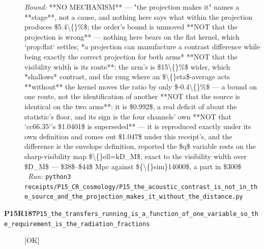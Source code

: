 \begin{description}
 \emph{Bound:}  **NO MECHANISM** --- "the projection makes it" names a **stage**, not a cause, and nothing here says what within the projection produces \$5.4\textbackslash\{\}\%\$; the order's bound is unmoved  **NOT that the projection is wrong** --- nothing here bears on the flat kernel, which `prop:flat` settles; *a projection can manufacture a contrast difference while being exactly the correct projection for both arms*  **NOT that the visibility width is its route**: the arm's is \$15\textbackslash\{\}\%\$ wider, which *shallows* contrast, and the rung where an \$\textbackslash\{\}eta\$-average acts **without** the kernel moves the ratio by only \$-0.4\textbackslash\{\}\%\$ --- a bound on one route, not the identification of another  **NOT that the source is identical on the two arms**: it is \$0.992\$, a real deficit of about the statistic's floor, and its sign is the four channels' own  **NOT that `cc66.35`'s \$1.0401\$ is superseded** --- it is reproduced exactly under its own definition and comes out \$1.047\$ under this receipt's, and the difference is the envelope definition, reported  the \$q\$ variable rests on the sharp-visibility map \$\textbackslash\{\}ell=kD\_M\$, exact to the visibility width over \$D\_M\$ --- \$38\$--\$44\$ Mpc against \$\{\textbackslash\{\}sim\}14000\$, a part in \$300\$
\ \emph{Run:} \texttt{python3 receipts/P15\_CR\_cosmology/P15\_the\_acoustic\_contrast\_is\_not\_in\_the\_source\_and\_the\_projection\_makes\_it\_without\_the\_distance.py}
\item[\rcptlabel{P15_the_transfers_running_is_a_function_of_one_variable_so_the_requirement_is_the_radiation_fractions}{P15R187}\textbf{P15R187}\quad\texttt{P15\_the\_transfers\_running\_is\_a\_function\_of\_one\_variable\_so\_the\_requirement\_is\_the\_radiation\_fractions}]\hfill\textsf{[OK]}\\

\end{description}
